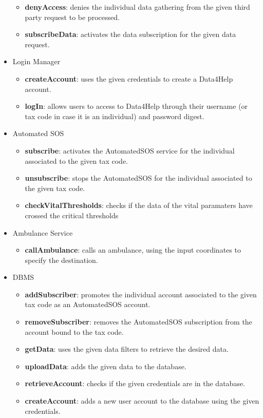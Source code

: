 \begin{itemize}
\begin{itemize}
\item \textbf{denyAccess}: denies the individual data gathering from the given third party request to be processed.
\item \textbf{subscribeData}: activates the data subscription for the given data request.
\end{itemize}
\item Login Manager
\begin{itemize}
\item \textbf{createAccount}: uses the given credentials to create a Data4Help account.
\item \textbf{logIn}: allows users to access to Data4Help through their username (or tax code in case it is an individual) and password digest.
\end{itemize}
\item Automated SOS
\begin{itemize}
\item \textbf{subscribe}: activates the AutomatedSOS service for the individual associated to the given tax code.
\item \textbf{unsubscribe}: stops the AutomatedSOS for the individual associated to the given tax code.
\item \textbf{checkVitalThresholds}: checks if the data of the vital paramaters have crossed the critical thresholds
\end{itemize}
\item Ambulance Service
\begin{itemize}
\item \textbf{callAmbulance}: calls an ambulance, using the input coordinates to specify the destination.
\end{itemize}
\item DBMS
\begin{itemize}
\item \textbf{addSubscriber}: promotes the individual account associated to the given tax code as an AutomatedSOS account.
\item \textbf{removeSubscriber}: removes the AutomatedSOS subscription from the account bound to the tax code.
\item \textbf{getData}: uses the given data filters to retrieve the desired data.
\item \textbf{uploadData}: adds the given data to the database.
\item \textbf{retrieveAccount}: checks if the given credentials are in the database.
\item \textbf{createAccount}: adds a new user account to the database using the given credentials.

\end{itemize}
\end{itemize}
